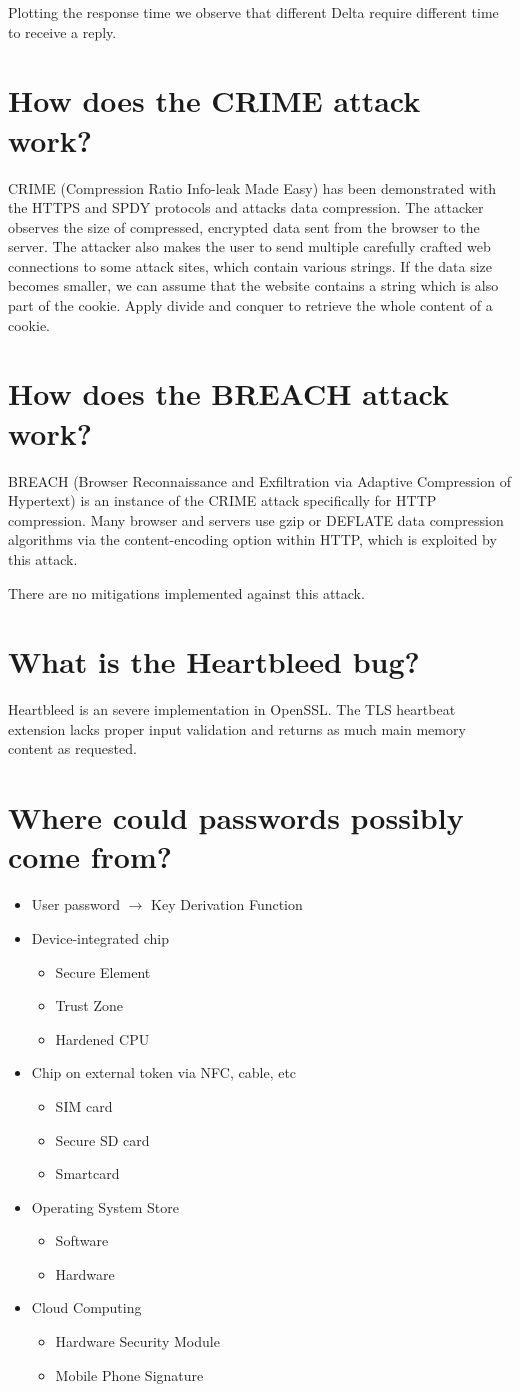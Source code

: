 \documentclass[twocolumn]{article}
\newcommand{\question}[1]{\section{#1}}
\begin{document}
Plotting the response time we observe that different Delta require different time to receive a reply.

\question{How does the CRIME attack work?}
%
CRIME (Compression Ratio Info-leak Made Easy) has been demonstrated with the HTTPS and SPDY protocols and attacks data compression. The attacker observes the size of compressed, encrypted data sent from the browser to the server. The attacker also makes the user to send multiple carefully crafted web connections to some attack sites, which contain various strings. If the data size becomes smaller, we can assume that the website contains a string which is also part of the cookie. Apply divide and conquer to retrieve the whole content of a cookie.

\question{How does the BREACH attack work?}
%
BREACH (Browser Reconnaissance and Exfiltration via Adaptive Compression of Hypertext) is an instance of the CRIME attack specifically for HTTP compression. Many browser and servers use gzip or DEFLATE data compression algorithms via the content-encoding option within HTTP, which is exploited by this attack.

There are no mitigations implemented against this attack.

\question{What is the Heartbleed bug?}
%
Heartbleed is an severe implementation in OpenSSL. The TLS heartbeat extension lacks proper input validation and returns as much main memory content as requested.

\question{Where could passwords possibly come from?}
%
\begin{itemize}
  \item User password $\rightarrow$ Key Derivation Function
  \item Device-integrated chip
    \begin{itemize}
      \item Secure Element
      \item Trust Zone
      \item Hardened CPU
    \end{itemize}
  \item Chip on external token via NFC, cable, etc
    \begin{itemize}
      \item SIM card
      \item Secure SD card
      \item Smartcard
    \end{itemize}
  \item Operating System Store
    \begin{itemize}
      \item Software
      \item Hardware
    \end{itemize}
  \item Cloud Computing
    \begin{itemize}
      \item Hardware Security Module
      \item Mobile Phone Signature
    \end{itemize}
\end{itemize}
\end{document}

